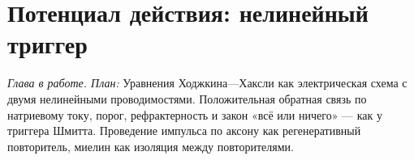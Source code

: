 \chapter{Потенциал действия: нелинейный триггер}
\label{sec:actionpotential}

\emph{Глава в работе. План:} Уравнения Ходжкина---Хаксли как электрическая схема с двумя нелинейными проводимостями. Положительная обратная связь по натриевому току, порог, рефрактерность и закон «всё или ничего» --- как у триггера Шмитта. Проведение импульса по аксону как регенеративный повторитель, миелин как изоляция между повторителями.
